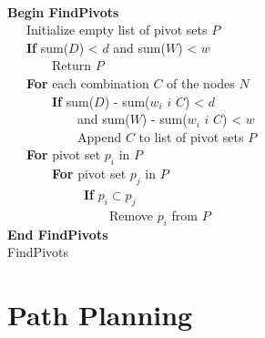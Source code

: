 \documentclass{tamuccthesis}
\begin{document}
\begin{algorithm}%
 \\
\textbf{Begin FindPivots}\\
~~~Initialize empty list of pivot sets $P$ \\
~~~\textbf{If} sum($D$) < $d$ and sum($W$) < $w$ \\
~~~~~~~Return $P$ \\
~~~\textbf{For} each combination $C$ of the nodes $N$ \\
~~~~~~~\textbf{If} sum($D$) - sum($w_i$ \forall $i$ \in $C$) < $d$ \\
~~~~~~~~~~~and sum($W$) - sum($w_i$ \forall $i$ \in $C$) < $w$ \\
~~~~~~~~~~~Append $C$ to list of pivot sets $P$ \\
~~~\textbf{For} pivot set $p_i$ in $P$ \\
~~~~~~~\textbf{For} pivot set $p_j$ in $P$ \\
~~~~~~~~~~~~\textbf{If} $p_i \subset p_j$ \\
~~~~~~~~~~~~~~~~Remove $p_i$ from $P$ \\
\textbf{End FindPivots}\\
\caption{FindPivots} 
\label{alg:find_pivots}
\end{algorithm}

\section{Path Planning}
\end{document}
